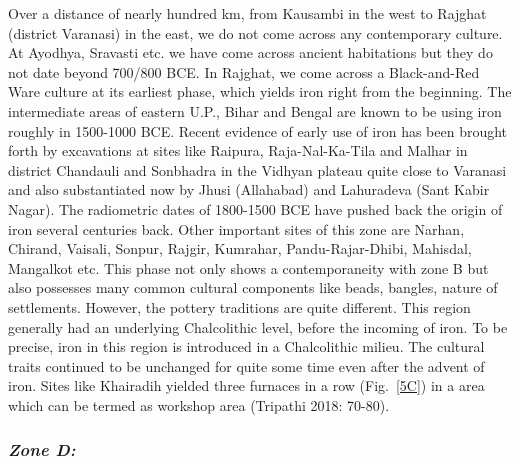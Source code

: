 Over a distance of nearly hundred km, from Kausambi in the west to Rajghat (district Varanasi) in the east, we do not come across any contemporary culture. At Ayodhya, Sravasti etc. we have come across ancient habitations but they do not date beyond 700/800 BCE. In Rajghat, we come across a Black-and-Red Ware culture at its earliest phase, which yields iron right from the beginning. The intermediate areas of eastern U.P., Bihar and Bengal are known to be using iron roughly in 1500-1000 BCE. Recent evidence of early use of iron has been brought forth by excavations at sites like Raipura, Raja-Nal-Ka-Tila and Malhar in district Chandauli and Sonbhadra in the Vidhyan plateau quite close to Varanasi and also substantiated now by Jhusi (Allahabad) and Lahuradeva (Sant Kabir Nagar). The radiometric dates of 1800-1500 BCE have pushed back the origin of iron several centuries back. Other important sites of this zone are Narhan, Chirand, Vaisali, Sonpur, Rajgir, Kumrahar, Pandu-Rajar-Dhibi, Mahisdal, Mangalkot etc. This phase not only shows a contemporaneity with zone B but also possesses many common cultural components like beads, bangles, nature of settlements. However, the pottery traditions are quite different. This region generally had an underlying Chalcolithic level, before the incoming of iron. To be precise, iron in this region is introduced in a Chalcolithic milieu. The cultural traits continued to be unchanged for quite some time even after the advent of iron. Sites like Khairadih yielded three furnaces in a row (Fig.~\ref{5C}) in a area which can be termed as workshop area (Tripathi 2018: 70-80).

\subsubsection*{\textit{Zone D:}}

